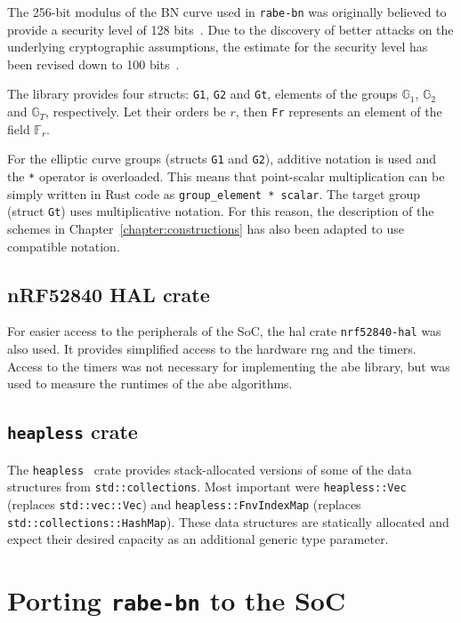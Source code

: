 The 256-bit modulus of the BN curve used in \texttt{rabe-bn} was originally believed to provide a security level of 128 bits~\cite{ben-sasson_succinct_2013}. 
Due to the discovery of better attacks on the underlying cryptographic assumptions, the estimate for the security level has been revised down to 100 bits~\cite{yonezawa_pairing-friendly_2019}.

The library provides four structs: \texttt{G1}, \texttt{G2} and \texttt{Gt}, elements of the groups $\mathbb{G}_1$, $\mathbb{G}_2$ and $\mathbb{G}_T$, respectively.
Let their orders be $r$, then \texttt{Fr} represents an element of the field $\mathbb{F}_r$.

For the elliptic curve groups (structs \texttt{G1} and \texttt{G2}), additive notation is used and the \texttt{*} operator is overloaded.
This means that point-scalar multiplication can be simply written in Rust code as \verb$group_element * scalar$.
The target group (struct \texttt{Gt}) uses multiplicative notation.
For this reason, the description of the schemes in Chapter~\ref{chapter:constructions} has also been adapted to use compatible notation.

\subsection*{nRF52840 HAL crate}
For easier access to the peripherals of the SoC, the \acrfull{hal} \gls{crate} \texttt{nrf52840-hal} was also used.
It provides simplified access to the hardware \acrfull{rng} and the timers.
Access to the timers was not necessary for implementing the \acrshort{abe} library, but was used to measure the runtimes of the \acrshort{abe} algorithms.

\subsection*{\texttt{heapless} crate}
The \texttt{heapless}~\cite{aparicio_heapless_nodate} crate provides stack-allocated versions of some of the data structures from \texttt{std::collections}. 
Most important were \texttt{heapless::Vec} (replaces \texttt{std::vec::Vec}) and \texttt{heapless::FnvIndexMap} (replaces \texttt{std::collections::HashMap}).
These data structures are statically allocated and expect their desired capacity as an additional generic type parameter.

\section{Porting \texttt{rabe-bn} to the SoC}

